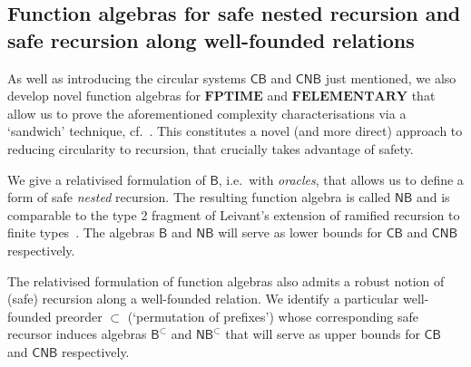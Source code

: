 \documentclass[manuscript,screen]{acmart}
\newcommand{\anupam}[1]{\todo{A: #1}}
\theoremstyle{definition}
\theoremstyle{remark}
\newcommand{\permpref}{\subset}
\newcommand{\ptime}{\mathbf{PTIME}}
\newcommand{\elementary}{\mathbf{ELEMENTARY}}
\newcommand{\f}{\mathbf{F}}
\newcommand{\fptime}{\f\ptime}
\newcommand{\felementary}{\f\elementary}
\newcommand{\bc}{\mathsf{B}}
\newcommand{\bcwfpo}[1]{\bc^{#1}}
\newcommand{\nested}{\mathsf{N}}
\newcommand{\nbc}{\nested\bc}
\newcommand{\nbcwfpo}[1]{\nested\bcwfpo{#1}}
\newcommand{\bcpp}{\bcwfpo{\permpref}}
\newcommand{\nbcpp}{\nbcwfpo{\permpref}}
\newcommand{\cyclic}{\mathsf{C}}
\newcommand{\cbc}{\cyclic\bc}
\newcommand{\ncbc}{\cyclic\nested\bc}
\begin{document}
\subsection*{Function algebras for safe nested recursion and safe recursion along well-founded relations}
As well as introducing the circular systems $\cbc$ and $\ncbc$ just mentioned, we also develop novel function algebras for $\fptime$ and $\felementary$ that allow us to prove the aforementioned complexity characterisations via a `sandwich' technique, cf.~.
This constitutes a novel (and more direct) approach to reducing circularity to recursion, 
that crucially takes advantage of safety.

We give a relativised formulation of $\bc$, i.e.\ with \emph{oracles}, that allows us to define a form of safe \emph{nested} recursion.
The resulting function algebra is called $\nbc$ and is comparable to the type 2 fragment of Leivant's extension of ramified recursion to finite types~\cite{Leivant99}.
The algebras $\bc$ and $\nbc$ will serve as lower bounds for $\cbc$ and $\ncbc$ respectively.

The relativised formulation of function algebras also admits a robust notion of (safe) recursion along a well-founded relation.
We identify a particular well-founded preorder $\permpref$ (`permutation of prefixes') whose corresponding safe recursor induces algebras $\bcpp$ and $\nbcpp$ that will serve as upper bounds for $\cbc$ and $\ncbc$ respectively.  



\end{document}

